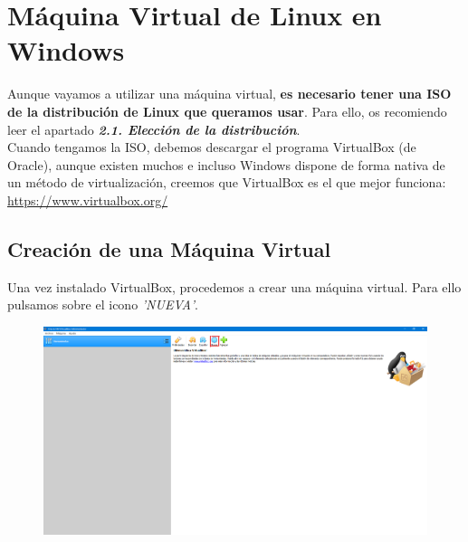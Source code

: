 \newpage
\section{Máquina Virtual de Linux en Windows}
Aunque vayamos a utilizar una máquina virtual, \textbf{es necesario tener una ISO de la distribución de Linux que queramos usar}.
\newline Para ello, os recomiendo leer el apartado \textbf{\textit{2.1. Elección de la distribución}}.
\newline\\
\noindent
Cuando tengamos la ISO, debemos descargar el programa VirtualBox (de Oracle), aunque existen muchos e incluso Windows dispone de forma nativa de un método de virtualización, creemos que VirtualBox es el que mejor funciona:
\newline \url{https://www.virtualbox.org/}

\subsection{Creación de una Máquina Virtual}
\noindent
Una vez instalado VirtualBox, procedemos a crear una máquina virtual.
\newline Para ello pulsamos sobre el icono \textit{'NUEVA'}.
    \begin{figure}[H]
        \centering
        \includegraphics[width= 0.7 \textwidth]{Media/VB1.png}
    \end{figure}
    
